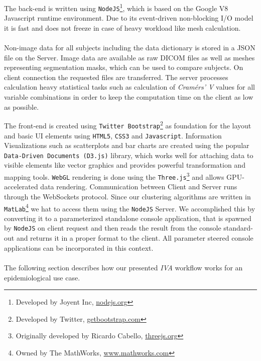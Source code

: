 \documentclass[journal]{style/vgtc} 			          %
\begin{document}
The back-end is written using \texttt{NodeJS}\footnote{Developed by Joyent Inc, \url{nodejs.org}}, which is based on the Google V8 Javascript runtime environment.
%
Due to its event-driven non-blocking I/O model it is fast and does not freeze in case of heavy workload like mesh calculation.
\\\\
Non-image data for all subjects including the data dictionary is stored in a JSON file on the Server.
%
Image data are available as raw DICOM files as well as meshes representing segmentation masks, which can be used to compare subjects.
%
On client connection the requested files are transferred.
%
The server processes calculation heavy statistical tasks such as calculation of \emph{Cram\'{e}rs' V} values for all variable combinations in order to keep the computation time on the client as low as possible.
%

The front-end is created using \texttt{Twitter Bootstrap}\footnote{Developed by Twitter, \url{getbootstrap.com}} as foundation for the layout and basic UI elements using \texttt{HTML5}, \texttt{CSS3} and \texttt{Javascript}.
%
Information Visualizations such as scatterplots and bar charts are created using the popular \texttt{Data-Driven Documents (D3.js)} \cite{D3} library, which works well for attaching data to visible elements like vector graphics and provides powerful transformation and mapping tools.
%
\texttt{WebGL} rendering is done using the \texttt{Three.js}\footnote{Originally developed by Ricardo Cabello, \url{threejs.org}} and allows GPU-accelerated data rendering.
%
Communication between Client and Server runs through the WebSockets protocol.
%
Since our clustering algorithms are written in \texttt{MatLab}\footnote{Owned by The MathWorks, \url{www.mathworks.com}} we hat to access them using the \texttt{NodeJS} Server.
%
We accomplished this by converting it to a parameterized standalone console application, that is spawned by \texttt{NodeJS} on client request and then reads the result from the console standard-out and returns it in a proper format to the client.
%
All parameter steered console applications can be incorporated in this context.
\\\\
The following section describes how our presented \emph{IVA} workflow works for an epidemiological use case.
\end{document}
